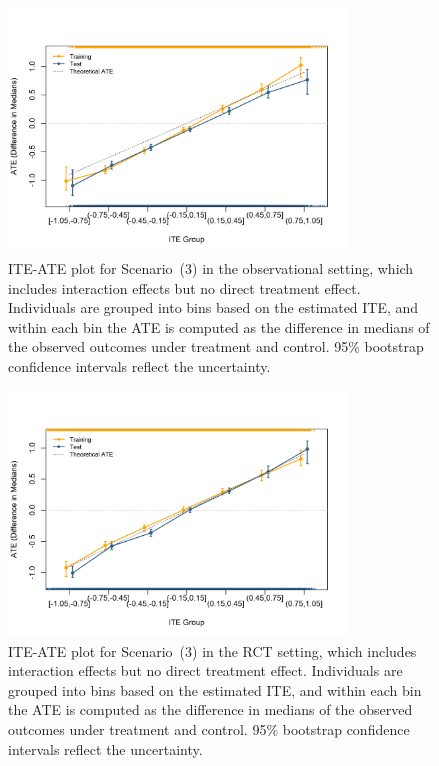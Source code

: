 \begin{figure}[htbp]
\centering
\includegraphics[width=0.8\textwidth]{img/results/observ_scenario3_ITE_ATE.png}
\vspace{-15pt}
\caption{ITE-ATE plot for Scenario~(3) in the observational setting, which includes interaction effects but no direct treatment effect. Individuals are grouped into bins based on the estimated ITE, and within each bin the ATE is computed as the difference in medians of the observed outcomes under treatment and control. 95\% bootstrap confidence intervals reflect the uncertainty.}
\label{fig:observ_scenario3_ite_ATE}
\end{figure}


\begin{figure}[htbp]
\centering
\includegraphics[width=0.8\textwidth]{img/results/rct_scenario3_ITE_ATE.png}
\vspace{-15pt}
\caption{ITE-ATE plot for Scenario~(3) in the RCT setting, which includes interaction effects but no direct treatment effect. Individuals are grouped into bins based on the estimated ITE, and within each bin the ATE is computed as the difference in medians of the observed outcomes under treatment and control. 95\% bootstrap confidence intervals reflect the uncertainty.}
\label{fig:rct_scenario3_ite_ATE}
\end{figure}







